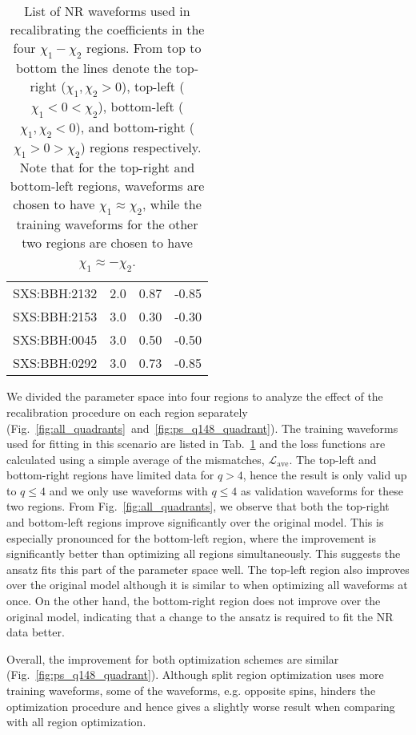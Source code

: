 \documentclass[twocolumn]{aastex631}
\begin{document}
\begin{table}[t]
\begin{tabularx}{0.8\columnwidth}{@{\extracolsep{\fill}}lrrr}
		SXS:BBH:2132 & 2.0 & 0.87     & -0.85    \\
		SXS:BBH:2153 & 3.0 & 0.30     & -0.30    \\
		SXS:BBH:0045 & 3.0 & 0.50     & -0.50    \\
		SXS:BBH:0292 & 3.0 & 0.73     & -0.85    \\ \midrule\bottomrule
	\end{tabularx}
	\caption{List of NR waveforms used in recalibrating the coefficients in the four $\chi_1-\chi_2$ regions.
	From top to bottom the lines denote the top-right ($\chi_1,\chi_2>0$), top-left ($\chi_1<0<\chi_2$),
	bottom-left ($\chi_1,\chi_2<0$), and bottom-right ($\chi_1>0>\chi_2$) regions respectively.
	Note that for the top-right and bottom-left regions, waveforms are chosen to have $\chi_1\approx\chi_2$,
	while the training waveforms for the other two regions are chosen to have $\chi_1\approx-\chi_2$.}
	\label{tab:quadrants}
\end{table}

We divided the parameter space into four regions to analyze the effect of the
recalibration procedure on each region separately
(Fig.~\ref{fig:all_quadrants}~and~\ref{fig:ps_q148_quadrant}). The training waveforms used for fitting in
this scenario are listed in Tab.~\ref{tab:quadrants} and the loss functions 
are calculated using a simple average of the mismatches, $\mathcal{L}_{\mathrm{ave}}$. The top-left and
bottom-right regions have limited data for $q>4$, hence the result is only valid up to $q\leq4$ and we only use waveforms with $q\leq4$ as validation waveforms for these two regions. 
From Fig.~\ref{fig:all_quadrants}, we observe that both the top-right and bottom-left regions improve significantly over the original model.
This is especially pronounced for the bottom-left region, where the improvement is significantly better than optimizing all regions simultaneously.
This suggests the ansatz fits this part of the parameter space well.
The top-left region also improves over the original model although it is similar to when optimizing all waveforms at once.
On the other hand, the bottom-right region does not improve over the original model, indicating that a change to the ansatz is required to fit the NR data better.

Overall, the improvement for both optimization schemes are similar (Fig.~\ref{fig:ps_q148_quadrant}).
Although split region optimization uses more training waveforms, some of the waveforms,
e.g. opposite spins, hinders the optimization procedure and hence gives a slightly worse result when comparing with all region optimization.
\end{document}
